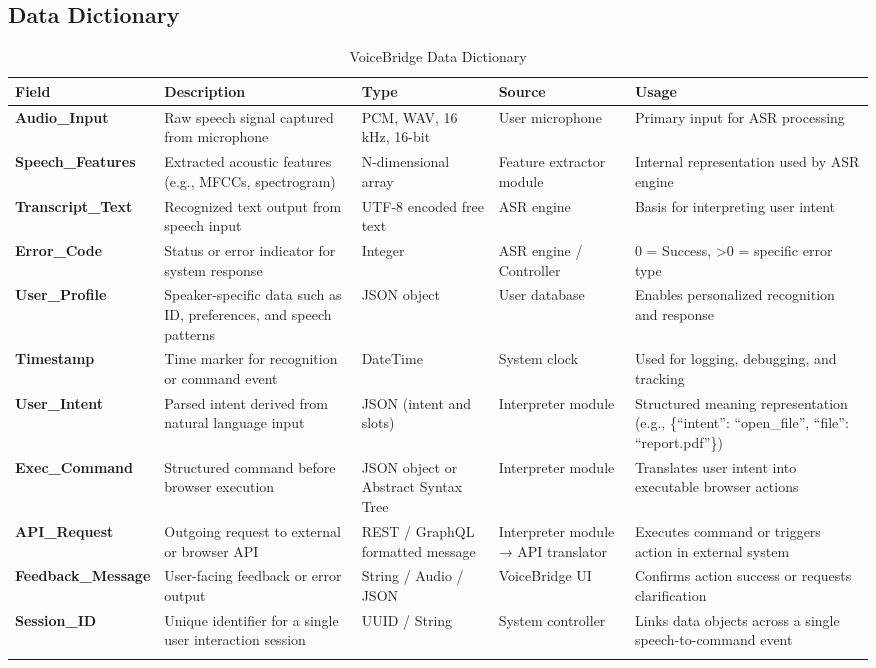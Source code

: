 \documentclass[11pt]{article}
\begin{document}
\subsection{Data Dictionary}

\begin{table}[H]
\centering
\footnotesize

\begin{tabularx}{\textwidth}{p{3cm} p{4cm} X  X p{4cm}}
\toprule
\textbf{Field} & \textbf{Description} & \textbf{Type} & \textbf{Source} & \textbf{Usage} \\
\midrule
\textbf{Audio\_Input} & Raw speech signal captured from microphone & PCM, WAV, 16 kHz, 16-bit & User microphone & Primary input for ASR processing \\
\hline
\textbf{Speech\_Features} & Extracted acoustic features (e.g., MFCCs, spectrogram) & N-dimensional array & Feature extractor module & Internal representation used by ASR engine \\
\hline
\textbf{Transcript\_Text} & Recognized text output from speech input & UTF-8 encoded free text & ASR engine & Basis for interpreting user intent \\
\hline
\textbf{Error\_Code} & Status or error indicator for system response & Integer & ASR engine / Controller & 0 = Success, >0 = specific error type \\
\hline
\textbf{User\_Profile} & Speaker-specific data such as ID, preferences, and speech patterns & JSON object & User database & Enables personalized recognition and response \\
\hline
\textbf{Timestamp} & Time marker for recognition or command event & DateTime & System clock & Used for logging, debugging, and tracking \\
\hline
\textbf{User\_Intent} & Parsed intent derived from natural language input & JSON (intent and slots) & Interpreter module & Structured meaning representation (e.g., \{“intent”: “open\_file”, “file”: “report.pdf”\}) \\
\hline
\textbf{Exec\_Command} & Structured command before browser execution & JSON object or Abstract Syntax Tree & Interpreter module & Translates user intent into executable browser actions \\
\hline
\textbf{API\_Request} & Outgoing request to external or browser API & REST / GraphQL formatted message & Interpreter module → API translator & Executes command or triggers action in external system \\
\hline
\textbf{Feedback\_Message} & User-facing feedback or error output & String / Audio / JSON & VoiceBridge UI & Confirms action success or requests clarification \\
\hline
\textbf{Session\_ID} & Unique identifier for a single user interaction session & UUID / String & System controller & Links data objects across a single speech-to-command event \\
\bottomrule
\caption{VoiceBridge Data Dictionary}
\end{tabularx}
\end{table}
\end{document}
